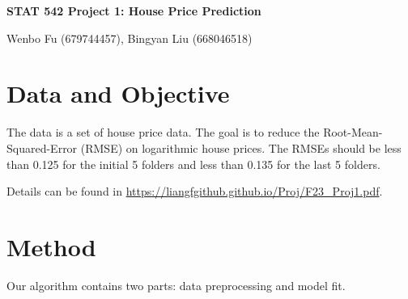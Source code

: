 \documentclass[12pt]{article}
\theoremstyle{plain}
\renewcommand{\title}[1]{\vbox{\center\bf{\Large{#1}}}\vspace{5mm}}
\renewcommand{\author}[1]{\vbox{\center#1}\vspace{5mm}}
\begin{document}
\begin{center}
\title{STAT 542 Project 1: House Price Prediction}

\author{Wenbo Fu (679744457), Bingyan Liu (668046518)}

\end{center}
  

\baselineskip=17.63pt 


\section{Data and Objective}

The data is a set of house price data. The goal is to reduce the Root-Mean-Squared-Error (RMSE) on logarithmic house prices. The RMSEs should be less than 0.125 for the initial 5 folders and less than 0.135 for the last 5 folders.

Details can be found in \url{https://liangfgithub.github.io/Proj/F23_Proj1.pdf}. 

\section{Method}
Our algorithm contains two parts: data preprocessing and model fit. 
\end{document}
